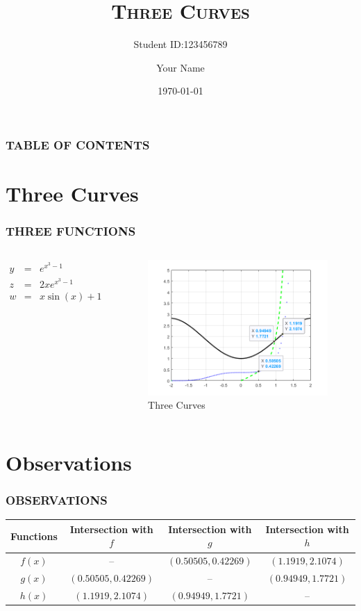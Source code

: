 \documentclass{beamer}
\title{\textsc{Three Curves}}
\subtitle{Student ID:123456789}
\author{Your Name}
\institute{UNNC}
\date{\today}
\begin{document}
\begin{frame} %
\titlepage
\end{frame}

\begin{frame}\frametitle{TABLE OF CONTENTS}\label{TO}
\tableofcontents
\end{frame}

\section{Three Curves}
\begin{frame}\frametitle{THREE FUNCTIONS}\label{TF}
\begin{columns}
\begin{eqnarray}
y & = & e^{x^3-1}\\
z & = & 2x e^{x^3-1}\\
w & = & x\sin(x)+1
\end{eqnarray}

\begin{figure}
\centering
\includegraphics[scale=0.45]{threeCurves}
\caption{Three Curves}
\end{figure}
\end{columns}
\end{frame}

\section{Observations}
\begin{frame}\frametitle{OBSERVATIONS}\label{OBS}
\begin{table}[h]
\begin{tabular}{c|c|c|c}
Functions & Intersection with $f$ & Intersection with $g$ & Intersection with $h$\\
\hline
\hline
$f(x)$ & -- & $(0.50505,0.42269)$ & $(1.1919,2.1074)$\\
\hline
$g(x)$ & $(0.50505,0.42269)$ & -- & $(0.94949,1.7721)$\\
\hline
$h(x)$ & $(1.1919,2.1074)$ & $(0.94949,1.7721)$ & --\\
\hline
\end{tabular}
\end{table}
\end{frame}
\end{document}
